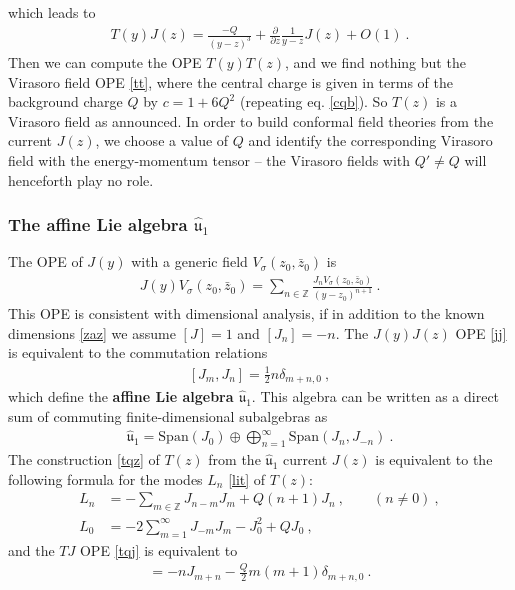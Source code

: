 \documentclass[12pt, a4paper, notitlepage, twoside]{report}
\numberwithin{equation}{section}
\theoremstyle{break}
\begin{document}
which leads to 
\begin{align}
 \boxed{T(y)J(z) = \frac{-Q}{(y-z)^3} +{\frac{\partial}{\partial z}}\frac{1}{y-z}J(z) + O(1)}\ .
\label{tqj}
\end{align}
Then we can compute the OPE $T(y)T(z)$, and we find nothing but the Virasoro field OPE \eqref{tt}, where the central charge is given in terms of the background charge $Q$ by $c = 1+6 Q^2$ (repeating eq. \eqref{cqb}). 
So $T(z)$ is a Virasoro field as announced. 
In order to build conformal field theories from the current $J(z)$, we choose a value of $Q$ and identify the corresponding Virasoro field with the energy-momentum tensor -- the Virasoro fields with $Q'\neq Q$ will henceforth play no role.

\subsubsection{The affine Lie algebra \boldmath $\hat{\mathfrak{u}}_1$}

The OPE of $J(y)$ with a generic field $V_\sigma(z_0,\bar{z}_0)$ is 
\begin{align}
 \boxed{J(y) V_\sigma(z_0,\bar{z}_0) = \sum_{n\in {\mathbb{Z}}} \frac{J_n V_\sigma(z_0,\bar{z}_0)}{(y-z_0)^{n+1}}}\ .
\label{jvn}
\end{align}
This OPE is consistent with dimensional analysis, if in addition to the known dimensions \eqref{zaz} we assume $[J]=1$ and $[J_n]=-n$.
The $J(y)J(z)$ OPE \eqref{jj} is equivalent to the commutation relations
\begin{align}
 \boxed{ [J_m,J_n] =  \frac12 n \delta_{m+n,0}}\ ,
\label{jmjn}
\end{align}
which define the  \textbf{\boldmath affine Lie algebra $\hat{\mathfrak{u}}_1$}.
This algebra can be written as a direct sum of commuting finite-dimensional subalgebras as 
\begin{align}
 \hat{\mathfrak{u}}_1 = \text{Span}(J_0) \oplus \bigoplus_{n=1}^\infty \text{Span}(J_n,J_{-n}) \ .
\end{align}
The construction \eqref{tqz} of $T(z)$ from the $\hat{\mathfrak{u}}_1$ current $J(z)$ is equivalent to the following formula for the modes $L_n$ \eqref{lit} of $T(z)$:
\begin{align}
 L_n &= -\sum_{m\in{\mathbb{Z}}} J_{n-m}J_m + Q(n+1)J_n\ , \qquad (n\neq 0)\ ,
\label{lnj}
\\
L_0 &=-2\sum_{m=1}^\infty J_{-m}J_m -J_0^2+QJ_0 \ ,
\label{lzj}
\end{align}
and the $TJ$ OPE \eqref{tqj} is equivalent to 
\begin{align}
 [L_m,J_n] = -nJ_{m+n} -\frac{Q}{2}m(m+1) \delta_{m+n,0} \ . 
\end{align}
\end{document}
